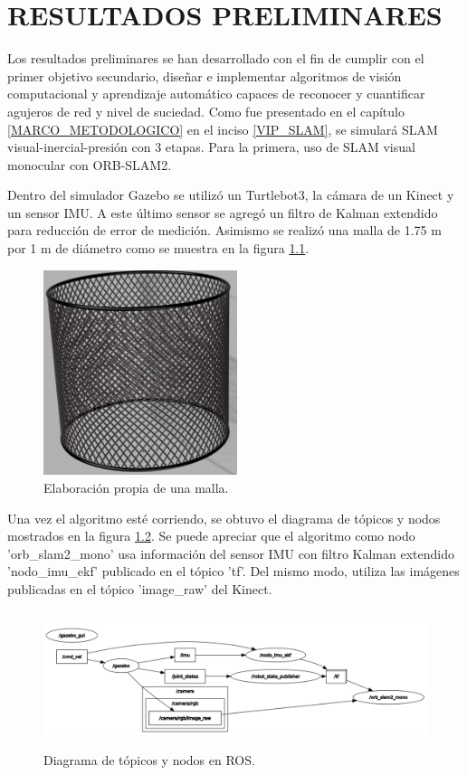 \chapter{RESULTADOS PRELIMINARES}

Los resultados preliminares se han desarrollado con el fin de cumplir con el primer objetivo secundario, diseñar e implementar algoritmos de visión computacional y aprendizaje automático capaces de reconocer y cuantificar agujeros de red y nivel de suciedad. Como fue presentado en el capítulo \ref{MARCO_METODOLOGICO} en el inciso \ref{VIP_SLAM}, se simulará SLAM visual-inercial-presión con 3 etapas. Para la primera, uso de SLAM visual monocular con ORB-SLAM2.

Dentro del simulador Gazebo se utilizó un Turtlebot3, la cámara de un Kinect y un sensor IMU. A este último sensor se agregó un filtro de Kalman extendido para reducción de error de medición. Asimismo se realizó una malla de 1.75 m por 1 m de diámetro como se muestra en la figura \ref{fig:malla}.

\begin{figure} [!h]
    \begin{center}
    \includegraphics[height=6cm]{images/malla} 
    \caption{\label{fig:malla}Elaboración propia de una malla.}
    \end{center}
\end{figure}

Una vez el algoritmo esté corriendo, se obtuvo el diagrama de tópicos y nodos mostrados en la figura \ref{fig:rqt_graph}. Se puede apreciar que el algoritmo como nodo 'orb\_slam2\_mono' usa información del sensor IMU con filtro Kalman extendido 'nodo\_imu\_ekf' publicado en el tópico 'tf'. Del mismo modo, utiliza las imágenes publicadas en el tópico 'image\_raw' del Kinect. 

\begin{figure}[!h]
    \begin{center}
    \includegraphics[height=4cm]{images/rqt_graph} 
    \caption{\label{fig:rqt_graph}Diagrama de tópicos y nodos en ROS.}
    \end{center}
\end{figure}

